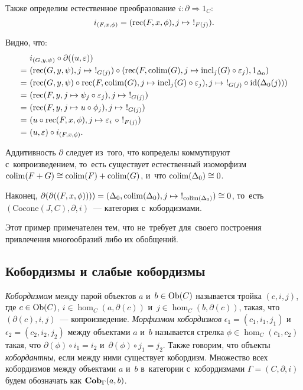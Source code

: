 \documentclass[a4paper,oneside]{article}
\begin{document}
Также определим естественное преобразование $i : \partial \Rightarrow 1_C$:
\[
  i_{(F, x, \phi)} = (\mathrm{rec}(F, x, \phi), j \mapsto\ !_{F(j)}).
\]

Видно, что:
\[
\begin{aligned}
  \phantom{=}&\ i_{(G, y, \psi)} \circ \partial((u, \varepsilon)) \\
            =&\ (\rec(G, y, \psi), j \mapsto\ !_{G(j)}) \circ (\rec(F, \colim(G), j \mapsto \incl_j(G) \circ \varepsilon_j), 1_{\Delta_0}) \\
            =&\ (\rec(G, y, \psi) \circ \rec(F, \colim(G), j \mapsto \incl_j(G) \circ \varepsilon_j), j \mapsto\ !_{G(j)} \circ \id(\Delta_0(j))) \\
            =&\ (\rec(F, y, j \mapsto \psi_j \circ \varepsilon_j), j \mapsto\ !_{G(j)}) \\
            =&\ (\rec(F, y, j \mapsto u \circ \phi_j), j \mapsto\ !_{G(j)}) \\
            =&\ (u \circ \rec(F, x, \phi), j \mapsto \varepsilon_i\ \circ\ !_{F(j)}) \\
            =&\ (u, \varepsilon) \circ i_{(F, x, \phi)}.
\end{aligned}
\]

Аддитивность $\partial$ следует из~того, что копределы коммутируют с~копроизведением,
то~есть существует естественный изоморфизм $\mathrm{colim}(F + G) \cong \mathrm{colim}(F) + \mathrm{colim}(G)$,
и~что $\mathrm{colim}(\Delta_0) \cong 0$.

Наконец, $\partial(\partial((F, x, \phi)))) = (\Delta_0, \mathrm{colim}(\Delta_0), j \mapsto\ !_{\mathrm{colim}(\Delta_0)}) \cong 0$,
то~есть $(\mathrm{Cocone}(J, C), \partial, i)$~— категория с~кобордизмами.

Этот пример примечателен тем, что не~требует для~своего построения привлечения многообразий либо их обобщений.

\subsection{Кобордизмы и слабые кобордизмы}
\textit{Кобордизмом} между парой объектов $a$ и~$b \in \mathrm{Ob}(C)$ называется тройка $(c, i, j)$,
где $c \in \mathrm{Ob}(C)$, $i \in \hom_C(a, \partial(c))$ и~$j \in \hom_C(b, \partial(c))$,
такая, что $(\partial(c), i, j)$~— копроизведение. \textit{Морфизмом кобордизмов} $\epsilon_1 = (c_1, i_1, j_1)$
и~$\epsilon_2 = (c_2, i_2, j_2)$ между объектами $a$ и~$b$ называется стрелка $\phi \in \hom_C(c_1, c_2)$
такая, что $\partial(\phi) \circ i_1 = i_2$ и~$\partial(\phi) \circ j_1 = j_2$. Также говорим, что объекты \textit{кобордантны,}
если между ними существует кобордизм. Множество всех кобордизмов между объектами $a$ и~$b$ в~категории с~кобордизмами
$\Gamma = (C, \partial, i)$ будем обозначать как $\mathbf{Cob}_\Gamma(a, b)$.
\end{document}

